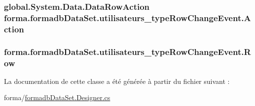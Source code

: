 \subsubsection[{\texorpdfstring{Action}{Action}}]{\setlength{\rightskip}{0pt plus 5cm}global.\+System.\+Data.\+Data\+Row\+Action forma.\+formadb\+Data\+Set.\+utilisateurs\+\_\+type\+Row\+Change\+Event.\+Action\hspace{0.3cm}{\ttfamily [get]}}\hypertarget{classforma_1_1formadb_data_set_1_1utilisateurs__type_row_change_event_a9f077fbbb710f9d3c3eab9bd12e24e80}{}\label{classforma_1_1formadb_data_set_1_1utilisateurs__type_row_change_event_a9f077fbbb710f9d3c3eab9bd12e24e80}
\subsubsection[{\texorpdfstring{Row}{Row}}]{ forma.\+formadb\+Data\+Set.\+utilisateurs\+\_\+type\+Row\+Change\+Event.\+Row\hspace{0.3cm}{\ttfamily [get]}}\hypertarget{classforma_1_1formadb_data_set_1_1utilisateurs__type_row_change_event_a56f16fc805e9489e143f07c78c76f37e}{}\label{classforma_1_1formadb_data_set_1_1utilisateurs__type_row_change_event_a56f16fc805e9489e143f07c78c76f37e}


La documentation de cette classe a été générée à partir du fichier suivant \+:\begin{DoxyCompactItemize}
\item 
forma/\hyperlink{formadb_data_set_8_designer_8cs}{formadb\+Data\+Set.\+Designer.\+cs}\end{DoxyCompactItemize}
